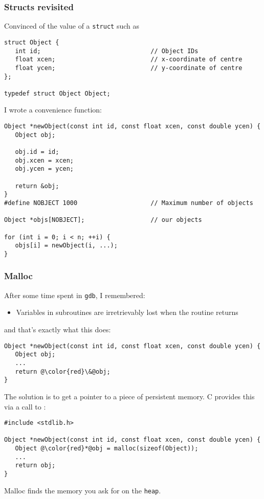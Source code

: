 \documentclass[10pt, t]{beamer}
\begin{document}
\begin{frame}[fragile]
\frametitle{Structs revisited}
\label{sec-5_1_14}


Convinced of the value of a \texttt{struct} such as
\begin{verbatim}
struct Object {
   int id;                              // Object IDs
   float xcen;                          // x-coordinate of centre
   float ycen;                          // y-coordinate of centre
};

typedef struct Object Object;
\end{verbatim}
I wrote a convenience function:
\begin{verbatim}
Object *newObject(const int id, const float xcen, const double ycen) {
   Object obj;

   obj.id = id;
   obj.xcen = xcen;
   obj.ycen = ycen;

   return &obj;
}
#define NOBJECT 1000                    // Maximum number of objects

Object *objs[NOBJECT];                  // our objects

for (int i = 0; i < n; ++i) {
   objs[i] = newObject(i, ...);
}
\end{verbatim}
\end{frame}
\begin{frame}[fragile]
\frametitle{Malloc}
\label{sec-5_1_15}


After some time spent in \texttt{gdb}, I remembered: 

\begin{itemize}
\item Variables in subroutines are irretrievably lost when the routine returns
\end{itemize}
and that's exactly what this does:
\begin{verbatim}
Object *newObject(const int id, const float xcen, const double ycen) {
   Object obj;
   ...
   return @\color{red}\&@obj;
}
\end{verbatim}

\pause
The solution is to get a pointer to a piece of persistent memory.  
C provides this via a call to :
\begin{verbatim}
#include <stdlib.h>

Object *newObject(const int id, const float xcen, const double ycen) {
   Object @\color{red}*@obj = malloc(sizeof(Object));
   ...
   return obj;
}
\end{verbatim}
\pause
Malloc finds the memory you ask for on the \texttt{heap}.
\end{frame}
\end{document}
